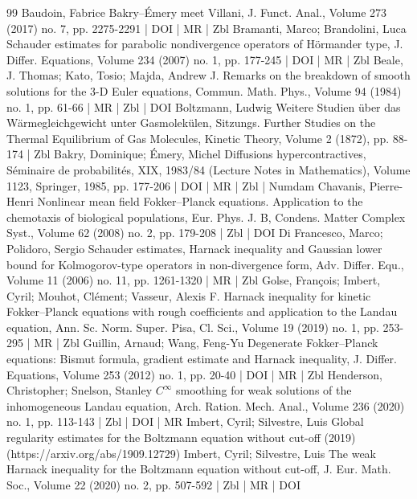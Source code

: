 \begin{thebibliography}{99}
Baudoin, Fabrice Bakry–Émery meet Villani, J. Funct. Anal., Volume 273 (2017) no. 7, pp. 2275-2291 | DOI | MR | Zbl
Bramanti, Marco; Brandolini, Luca Schauder estimates for parabolic nondivergence operators of Hörmander type, J. Differ. Equations, Volume 234 (2007) no. 1, pp. 177-245 | DOI | MR | Zbl
Beale, J. Thomas; Kato, Tosio; Majda, Andrew J. Remarks on the breakdown of smooth solutions for the $3$-D Euler equations, Commun. Math. Phys., Volume 94 (1984) no. 1, pp. 61-66 | MR | Zbl | DOI
Boltzmann, Ludwig Weitere Studien über das Wärmegleichgewicht unter Gasmolekülen, Sitzungs. Further Studies on the Thermal Equilibrium of Gas Molecules, Kinetic Theory, Volume 2 (1872), pp. 88-174 | Zbl
Bakry, Dominique; Émery, Michel Diffusions hypercontractives, Séminaire de probabilités, XIX, 1983/84 (Lecture Notes in Mathematics), Volume 1123, Springer, 1985, pp. 177-206 | DOI | MR | Zbl | Numdam
Chavanis, Pierre-Henri Nonlinear mean field Fokker–Planck equations. Application to the chemotaxis of biological populations, Eur. Phys. J. B, Condens. Matter Complex Syst., Volume 62 (2008) no. 2, pp. 179-208 | Zbl | DOI
Di Francesco, Marco; Polidoro, Sergio Schauder estimates, Harnack inequality and Gaussian lower bound for Kolmogorov-type operators in non-divergence form, Adv. Differ. Equ., Volume 11 (2006) no. 11, pp. 1261-1320 | MR | Zbl
Golse, François; Imbert, Cyril; Mouhot, Clément; Vasseur, Alexis F. Harnack inequality for kinetic Fokker–Planck equations with rough coefficients and application to the Landau equation, Ann. Sc. Norm. Super. Pisa, Cl. Sci., Volume 19 (2019) no. 1, pp. 253-295 | MR | Zbl
Guillin, Arnaud; Wang, Feng-Yu Degenerate Fokker–Planck equations: Bismut formula, gradient estimate and Harnack inequality, J. Differ. Equations, Volume 253 (2012) no. 1, pp. 20-40 | DOI | MR | Zbl
Henderson, Christopher; Snelson, Stanley ${C}^\infty $ smoothing for weak solutions of the inhomogeneous Landau equation, Arch. Ration. Mech. Anal., Volume 236 (2020) no. 1, pp. 113-143 | Zbl | DOI | MR
Imbert, Cyril; Silvestre, Luis Global regularity estimates for the Boltzmann equation without cut-off (2019) (https://arxiv.org/abs/1909.12729)
Imbert, Cyril; Silvestre, Luis The weak Harnack inequality for the Boltzmann equation without cut-off, J. Eur. Math. Soc., Volume 22 (2020) no. 2, pp. 507-592 | Zbl | MR | DOI

\end{thebibliography}
